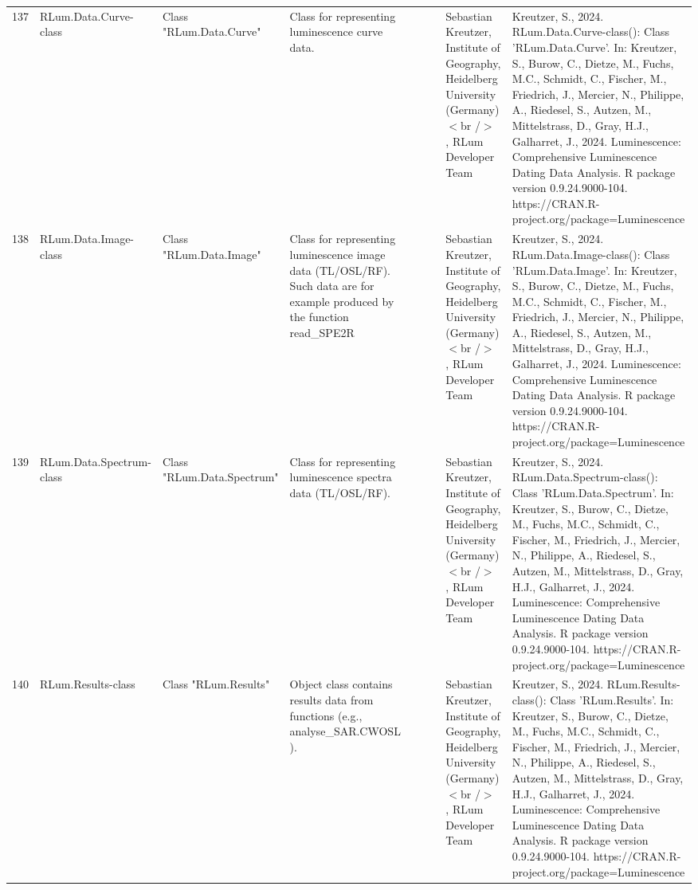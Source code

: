 \begin{table}[ht]
\begin{tabular}{rllllllll}
  137 & RLum.Data.Curve-class & Class  "RLum.Data.Curve" & Class for representing luminescence curve data. &  &  &  & Sebastian Kreutzer, Institute of Geography, Heidelberg University (Germany)$<$br /$>$ , RLum Developer Team & Kreutzer, S., 2024. RLum.Data.Curve-class(): Class 'RLum.Data.Curve'. In: Kreutzer, S., Burow, C., Dietze, M., Fuchs, M.C., Schmidt, C., Fischer, M., Friedrich, J., Mercier, N., Philippe, A., Riedesel, S., Autzen, M., Mittelstrass, D., Gray, H.J., Galharret, J., 2024. Luminescence: Comprehensive Luminescence Dating Data Analysis. R package version 0.9.24.9000-104. https://CRAN.R-project.org/package=Luminescence
 \\ 
  138 & RLum.Data.Image-class & Class  "RLum.Data.Image" & Class for representing luminescence image data (TL/OSL/RF). Such data are for example produced by the function  read\_SPE2R &  &  &  & Sebastian Kreutzer, Institute of Geography, Heidelberg University (Germany)$<$br /$>$ , RLum Developer Team & Kreutzer, S., 2024. RLum.Data.Image-class(): Class 'RLum.Data.Image'. In: Kreutzer, S., Burow, C., Dietze, M., Fuchs, M.C., Schmidt, C., Fischer, M., Friedrich, J., Mercier, N., Philippe, A., Riedesel, S., Autzen, M., Mittelstrass, D., Gray, H.J., Galharret, J., 2024. Luminescence: Comprehensive Luminescence Dating Data Analysis. R package version 0.9.24.9000-104. https://CRAN.R-project.org/package=Luminescence
 \\ 
  139 & RLum.Data.Spectrum-class & Class  "RLum.Data.Spectrum" & Class for representing luminescence spectra data (TL/OSL/RF). &  &  &  & Sebastian Kreutzer, Institute of Geography, Heidelberg University (Germany)$<$br /$>$ , RLum Developer Team & Kreutzer, S., 2024. RLum.Data.Spectrum-class(): Class 'RLum.Data.Spectrum'. In: Kreutzer, S., Burow, C., Dietze, M., Fuchs, M.C., Schmidt, C., Fischer, M., Friedrich, J., Mercier, N., Philippe, A., Riedesel, S., Autzen, M., Mittelstrass, D., Gray, H.J., Galharret, J., 2024. Luminescence: Comprehensive Luminescence Dating Data Analysis. R package version 0.9.24.9000-104. https://CRAN.R-project.org/package=Luminescence
 \\ 
  140 & RLum.Results-class & Class  "RLum.Results" & Object class contains results data from functions (e.g.,  analyse\_SAR.CWOSL ). &  &  &  & Sebastian Kreutzer, Institute of Geography, Heidelberg University (Germany)$<$br /$>$ , RLum Developer Team & Kreutzer, S., 2024. RLum.Results-class(): Class 'RLum.Results'. In: Kreutzer, S., Burow, C., Dietze, M., Fuchs, M.C., Schmidt, C., Fischer, M., Friedrich, J., Mercier, N., Philippe, A., Riedesel, S., Autzen, M., Mittelstrass, D., Gray, H.J., Galharret, J., 2024. Luminescence: Comprehensive Luminescence Dating Data Analysis. R package version 0.9.24.9000-104. https://CRAN.R-project.org/package=Luminescence

\end{tabular}
\end{table}
